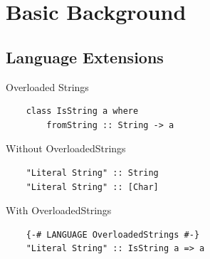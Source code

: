 \documentclass[pdf]{beamer}
\begin{document}

\section{Basic Background}

\subsection{Language Extensions}
\begin{frame}[fragile]{Overloaded Strings}
  \begin{verbatim}
    class IsString a where
        fromString :: String -> a
  \end{verbatim}
  \pause
  \vspace{1em}
  Without OverloadedStrings
  \begin{verbatim}
    "Literal String" :: String
    "Literal String" :: [Char]
  \end{verbatim}
  \pause
  \vspace{1em}
  With OverloadedStrings
  \begin{verbatim}
    {-# LANGUAGE OverloadedStrings #-}
    "Literal String" :: IsString a => a
  \end{verbatim}
\end{frame}
\end{document}
